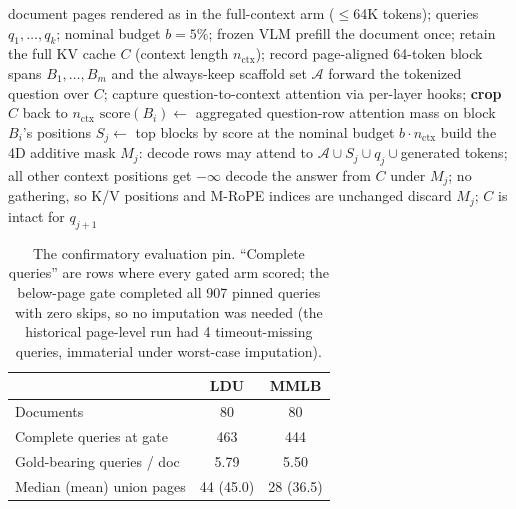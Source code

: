 \documentclass[letterpaper]{article} %
\newcommand{\paqc}{\textsc{PAQ-KV}}
\begin{document}
\begin{algorithm}[t]
\caption{\paqc{}: per-query reversible below-page KV-block selection with a 4D restricted-attention mask}
\label{alg:paqc}
\begin{algorithmic}[1]
\REQUIRE document pages rendered as in the full-context arm ($\le$64K tokens); queries $q_1,\ldots,q_k$; nominal budget $b=5\%$; frozen VLM
\STATE prefill the document once; retain the full KV cache $C$ (context length $n_{\mathrm{ctx}}$); record page-aligned 64-token block spans $B_1,\ldots,B_m$ and the always-keep scaffold set $\mathcal{A}$
\STATE forward the tokenized question over $C$; capture question-to-context attention via per-layer hooks; \textbf{crop} $C$ back to $n_{\mathrm{ctx}}$
\STATE $\mathrm{score}(B_i) \gets$ aggregated question-row attention mass on block $B_i$'s positions
\STATE $S_j \gets$ top blocks by score at the nominal budget $b \cdot n_{\mathrm{ctx}}$
\STATE build the 4D additive mask $M_j$: decode rows may attend to $\mathcal{A} \cup S_j \cup q_j \cup{}$generated tokens; all other context positions get $-\infty$
\STATE decode the answer from $C$ under $M_j$; no gathering, so K/V positions and M-RoPE indices are unchanged
\STATE discard $M_j$; $C$ is intact for $q_{j+1}$
\ENDFOR
\end{algorithmic}
\end{algorithm}

\begin{table}[t]
\centering\small
\setlength{\tabcolsep}{4pt}%
\begin{tabular}{lcc}
\toprule
 & LDU & MMLB \\
\midrule
Documents & 80 & 80 \\
Complete queries at gate & 463 & 444 \\
Gold-bearing queries / doc & 5.79 & 5.50 \\
Median (mean) union pages & 44 (45.0) & 28 (36.5) \\
\bottomrule
\end{tabular}
\caption{The confirmatory evaluation pin. ``Complete queries'' are rows where every gated arm scored; the below-page gate completed all 907 pinned queries with zero skips, so no imputation was needed (the historical page-level run had 4 timeout-missing queries, immaterial under worst-case imputation).}
\label{tab:pins}
\end{table}

\end{document}
